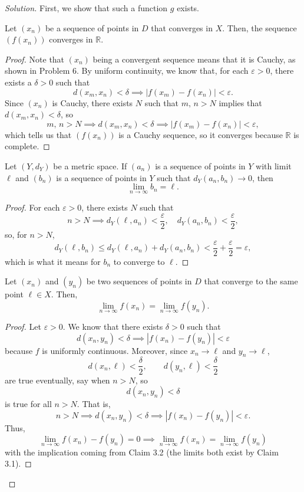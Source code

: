 \documentclass[11pt]{scrartcl}
\providecommand{\eps}{\varepsilon}
\providecommand{\RR}{\mathbb R}
\newenvironment{soln}{\begin{proof}[Solution]}{\end{proof}}
\begin{document}
\begin{soln}
	First, we show that such a function $g$ exists.
	\begin{claim}
		Let $(x_n)$ be a sequence of points in $D$ that converges in $X$.
		Then, the sequence $(f(x_n))$ converges in $\RR$.
	\end{claim}
	\begin{proof}
		Note that $(x_n)$ being a convergent sequence means that it is Cauchy,
		as shown in Problem 6.
		By uniform continuity, we know that, for each $\eps > 0$,
		there exists a $\delta > 0$ such that
		\[d(x_m, x_n) < \delta\implies |f(x_m) - f(x_n)| < \eps.\]
		Since $(x_n)$ is Cauchy, there exists $N$ such that
		$m,\,n > N$ implies that $d(x_m, x_n) < \delta$, so
		\[m,\,n > N \implies d(x_m, x_n) < \delta
		\implies |f(x_m) - f(x_n)| < \eps,\]
		which tells us that $(f(x_n))$ is a Cauchy sequence,
		so it converges because $\RR$ is complete.
	\end{proof}

	\begin{claim}
		Let $(Y, d_Y)$ be a metric space.
		If $(a_n)$ is a sequence of points in $Y$ with limit $\ell$ and
		$(b_n)$ is a sequence of points in $Y$ such that
		$d_Y(a_n, b_n) \to 0$, then
		\[\lim_{n\to\infty} b_n = \ell.\]
	\end{claim}
	\begin{proof}
		For each $\eps > 0$, there exists $N$ such that
		\[n > N \implies d_Y(\ell, a_n) < \frac\eps2,\quad
		d_Y(a_n, b_n) < \frac\eps2,\]
		so, for $n > N$,
		\[d_Y(\ell, b_n) \le d_Y(\ell, a_n) + d_Y(a_n, b_n)
		< \frac\eps2 + \frac\eps2 = \eps,\]
		which is what it means for $b_n$ to converge to $\ell$.
	\end{proof}
	
	\begin{claim}
		Let $(x_n)$ and $(y_n)$ be two sequences of points in $D$
		that converge to the same point $\ell\in X$.
		Then,
		\[\lim_{n\to\infty} f(x_n) = \lim_{n\to\infty} f(y_n).\]
	\end{claim}
	\begin{proof}
		Let $\eps > 0$. We know that there exists $\delta > 0$ such that
		\[d(x_n, y_n) < \delta \implies |f(x_n) - f(y_n)| < \eps\]
		because $f$ is uniformly continuous.
		Moreover, since $x_n\to \ell$ and $y_n\to\ell$,
		\[d(x_n, \ell) < \frac\delta2,\qquad d(y_n,\ell) < \frac\delta2\]
		are true eventually, say when $n > N$, so
		\[d(x_n, y_n) < \delta\]
		is true for all $n > N$. That is,
		\[n > N \implies d(x_n, y_n) < \delta \implies
		|f(x_n) - f(y_n)| < \eps.\]
		Thus,
		\[\lim_{n\to\infty} f(x_n) - f(y_n) = 0 \implies
		\lim_{n\to\infty} f(x_n) = \lim_{n\to\infty} f(y_n)\]
		with the implication coming from Claim 3.2
		(the limits both exist by Claim 3.1).
	\end{proof}
	

\end{soln}
\end{document}
